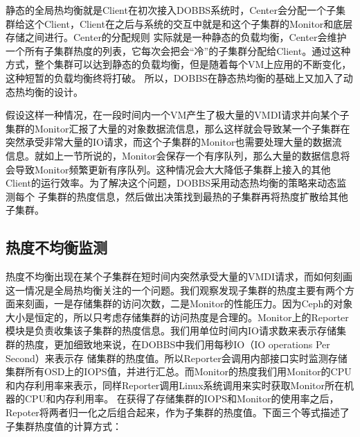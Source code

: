 静态的全局热均衡就是Client在初次接入DOBBS系统时，Center会分配一个子集群给这个Client，Client在之后与系统的交互中就是和这个子集群的Monitor和底层存储之间进行。Center的分配规则
实际就是一种静态的负载均衡，Center会维护一个所有子集群热度的列表，它每次会把会“冷”的子集群分配给Client。通过这种方式，整个集群可以达到静态的负载均衡，但是随着每个VM上应用的不断变化，这种短暂的负载均衡终将打破。
所以，DOBBS在静态热均衡的基础上又加入了动态热均衡的设计。

假设这样一种情况，在一段时间内一个VM产生了极大量的VMDI请求并向某个子集群的Monitor汇报了大量的对象数据流信息，那么这样就会导致某一个子集群在突然承受非常大量的IO请求，而这个子集群的Monitor也需要处理大量的数据流
信息。就如上一节所说的，Monitor会保存一个有序队列，那么大量的数据信息将会导致Monitor频繁更新有序队列。这种情况会大大降低子集群上接入的其他Client的运行效率。为了解决这个问题，DOBBS采用动态热均衡的策略来动态监测每个
子集群的热度信息，然后做出决策找到最热的子集群再将热度扩散给其他子集群。

\subsection{热度不均衡监测}
热度不均衡出现在某个子集群在短时间内突然承受大量的VMDI请求，而如何刻画这一情况是全局热均衡关注的一个问题。我们观察发现子集群的热度主要有两个方面来刻画，一是存储集群的访问次数，二是Monitor的性能压力。因为Ceph的对象
大小是恒定的，所以只考虑存储集群的访问热度是合理的。Monitor上的Reporter模块是负责收集该子集群的热度信息。我们用单位时间内IO请求数来表示存储集群的热度，更加细致地来说，在DOBBS中我们用每秒IO（IO operations Per Second）来表示存
储集群的热度值。所以Reporter会调用内部接口实时监测存储集群所有OSD上的IOPS值，并进行汇总。而Monitor的热度我们用Monitor的CPU和内存利用率来表示，同样Reporter调用Linux系统调用来实时获取Monitor所在机器的CPU和内存利用率。
在获得了存储集群的IOPS和Monitor的使用率之后，Repoter将两者归一化之后组合起来，作为子集群的热度值。下面三个等式描述了子集群热度值的计算方式：





